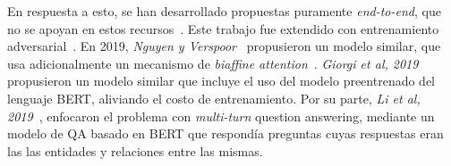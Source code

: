 En respuesta a esto, se han desarrollado propuestas puramente \textit{end-to-end}, que no se apoyan en estos recursos~\cite{bekoulis2018joint}.
Este trabajo fue extendido con entrenamiento adversarial~\cite{bekoulis2018adversarial}.
En 2019, \textit{Nguyen y Verspoor}~\cite{nguyen2019end} propusieron un modelo similar, que usa adicionalmente un mecanismo de \textit{biaffine attention}~\cite{biaffineattention}.
\textit{Giorgi et al, 2019}~\cite{giorgi2019end} propusieron un modelo similar que incluye el uso del modelo preentrenado del lenguaje BERT, aliviando el costo de entrenamiento.
Por su parte, \textit{Li et al, 2019}~\cite{li2019entity}, enfocaron el problema con \textit{multi-turn} question answering, mediante un modelo de QA basado en BERT que respondía preguntas cuyas respuestas eran las las entidades y relaciones entre las mismas.

